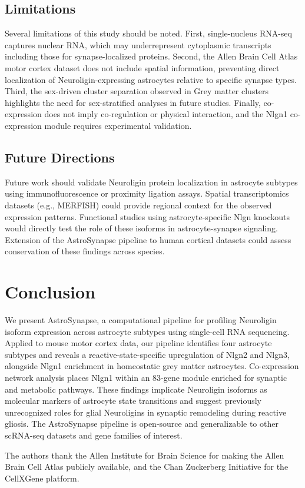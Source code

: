 \documentclass[sigconf]{acmart}
\begin{document}
\subsection{Limitations}
Several limitations of this study should be noted. First, single-nucleus RNA-seq captures nuclear RNA, which may underrepresent cytoplasmic transcripts including those for synapse-localized proteins. Second, the Allen Brain Cell Atlas motor cortex dataset does not include spatial information, preventing direct localization of Neuroligin-expressing astrocytes relative to specific synapse types. Third, the sex-driven cluster separation observed in Grey matter clusters highlights the need for sex-stratified analyses in future studies. Finally, co-expression does not imply co-regulation or physical interaction, and the Nlgn1 co-expression module requires experimental validation.

\subsection{Future Directions}
Future work should validate Neuroligin protein localization in astrocyte subtypes using immunofluorescence or proximity ligation assays. Spatial transcriptomics datasets (e.g., MERFISH) could provide regional context for the observed expression patterns. Functional studies using astrocyte-specific Nlgn knockouts would directly test the role of these isoforms in astrocyte-synapse signaling. Extension of the AstroSynapse pipeline to human cortical datasets could assess conservation of these findings across species.

\section{Conclusion}

We present AstroSynapse, a computational pipeline for profiling Neuroligin isoform expression across astrocyte subtypes using single-cell RNA sequencing. Applied to mouse motor cortex data, our pipeline identifies four astrocyte subtypes and reveals a reactive-state-specific upregulation of Nlgn2 and Nlgn3, alongside Nlgn1 enrichment in homeostatic grey matter astrocytes. Co-expression network analysis places Nlgn1 within an 83-gene module enriched for synaptic and metabolic pathways. These findings implicate Neuroligin isoforms as molecular markers of astrocyte state transitions and suggest previously unrecognized roles for glial Neuroligins in synaptic remodeling during reactive gliosis. The AstroSynapse pipeline is open-source and generalizable to other scRNA-seq datasets and gene families of interest.

\begin{acks}
The authors thank the Allen Institute for Brain Science for making the Allen Brain Cell Atlas publicly available, and the Chan Zuckerberg Initiative for the CellXGene platform.
\end{acks}



\end{document}
